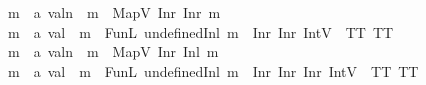 \begin{isabellebody}
\isamarkupfalse%
\ m{}{}\ {\isacharcolon}{\kern0pt}{\isacharcolon}{\kern0pt}\ {\isachardoublequoteopen}{\isacharprime}{\kern0pt}a\ valn{\isachardoublequoteclose}\ \ {\isachardoublequoteopen}m{}{}\ {\isasymequiv}\ MapV\ {\isacharparenleft}{\kern0pt}Inr\ {\isacharparenleft}{\kern0pt}Inr\ m{}{}{\isacharparenright}{\kern0pt}{\isacharparenright}{\kern0pt}{\isachardoublequoteclose}\isanewline
\isanewline
{}\isamarkupfalse%
\ m{}{}\ {\isacharcolon}{\kern0pt}{\isacharcolon}{\kern0pt}\ {\isachardoublequoteopen}{\isacharprime}{\kern0pt}a\ val{}{\isachardoublequoteclose}\ \ {\isachardoublequoteopen}m{}{}\ {\isasymequiv}\ FunL\ {\isacharparenleft}{\kern0pt}undefined{\isacharparenleft}{\kern0pt}Inl\ m{}{}\ {\isacharcolon}{\kern0pt}{\isacharequal}{\kern0pt}\ Inr\ {\isacharparenleft}{\kern0pt}Inr\ {\isacharparenleft}{\kern0pt}IntV{}\ {}{\isacharparenright}{\kern0pt}{\isacharparenright}{\kern0pt}{\isacharparenright}{\kern0pt}{\isacharparenright}{\kern0pt}\ TT\ TT{\isachardoublequoteclose}\isanewline
{}\isamarkupfalse%
\ m{}{}\ {\isacharcolon}{\kern0pt}{\isacharcolon}{\kern0pt}\ {\isachardoublequoteopen}{\isacharprime}{\kern0pt}a\ valn{\isachardoublequoteclose}\ \ {\isachardoublequoteopen}m{}{}\ {\isasymequiv}\ MapV\ {\isacharparenleft}{\kern0pt}Inr\ {\isacharparenleft}{\kern0pt}Inl\ m{}{}{\isacharparenright}{\kern0pt}{\isacharparenright}{\kern0pt}{\isachardoublequoteclose}\isanewline
\isanewline
{}\isamarkupfalse%
\ m{}{}\ {\isacharcolon}{\kern0pt}{\isacharcolon}{\kern0pt}\ {\isachardoublequoteopen}{\isacharprime}{\kern0pt}a\ val{}{\isachardoublequoteclose}\ \ {\isachardoublequoteopen}m{}{}\ {\isasymequiv}\ FunL\ {\isacharparenleft}{\kern0pt}undefined{\isacharparenleft}{\kern0pt}Inl\ m{}{}\ {\isacharcolon}{\kern0pt}{\isacharequal}{\kern0pt}\ Inr\ {\isacharparenleft}{\kern0pt}Inr\ {\isacharparenleft}{\kern0pt}Inr\ {\isacharparenleft}{\kern0pt}IntV{}\ {}{\isacharparenright}{\kern0pt}{\isacharparenright}{\kern0pt}{\isacharparenright}{\kern0pt}{\isacharparenright}{\kern0pt}{\isacharparenright}{\kern0pt}\ TT\ TT{\isachardoublequoteclose}\isanewline

\end{isabellebody}
